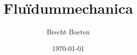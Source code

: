 
\usepackage[dutch]{babel}                %
\usepackage{amsmath,amsthm}              %
\usepackage{url}                         %
\usepackage{graphicx,subfigure}          %
\usepackage[utf8]{inputenc}              %
\usepackage[section]{placeins}			 %
\usepackage{multicol}
\usepackage[absolute,overlay]{textpos}



\title{Fluïdummechanica}
\author{Brecht Baeten}
\date{\today}

